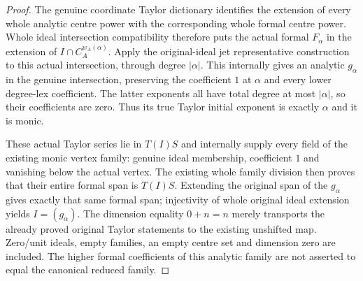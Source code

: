 \begin{proof}
The genuine coordinate Taylor dictionary identifies the extension of every
whole analytic centre power with the corresponding whole formal centre power.
Whole ideal intersection compatibility therefore puts the actual formal
$F_\alpha$ in the extension of $I\cap C_A^{w_A(\alpha)}$.
Apply the original-ideal jet representative construction to this actual
intersection, through degree $|\alpha|$. This internally gives an analytic
$g_\alpha$ in the genuine intersection, preserving the coefficient $1$ at
$\alpha$ and every lower degree-lex coefficient. The latter exponents all
have total degree at most $|\alpha|$, so their coefficients are zero.
Thus its true Taylor initial exponent is exactly $\alpha$ and it is monic.

These actual Taylor series lie in $T(I)S$ and internally supply every field
of the existing monic vertex family: genuine ideal membership, coefficient
$1$ and vanishing below the actual vertex. The existing whole family division
then proves that their entire formal span is $T(I)S$. Extending the original
span of the $g_\alpha$ gives exactly that same formal span; injectivity of
whole original ideal extension yields $I=(g_\alpha)$. The dimension equality
$0+n=n$ merely transports the already proved original Taylor statements to
the existing unshifted map. Zero/unit ideals, empty families, an empty centre
set and dimension zero are included. The higher formal coefficients of this
analytic family are not asserted to equal the canonical reduced family.
\end{proof}
